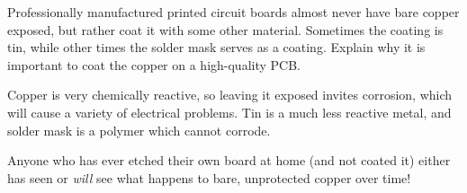 

Professionally manufactured printed circuit boards almost never have bare copper exposed, but rather coat it with some other material.  Sometimes the coating is tin, while other times the solder mask serves as a coating.  Explain why it is important to coat the copper on a high-quality PCB.







Copper is very chemically reactive, so leaving it exposed invites corrosion, which will cause a variety of electrical problems.  Tin is a much less reactive metal, and solder mask is a polymer which cannot corrode.







Anyone who has ever etched their own board at home (and not coated it) either has seen or {\it will} see what happens to bare, unprotected copper over time!




